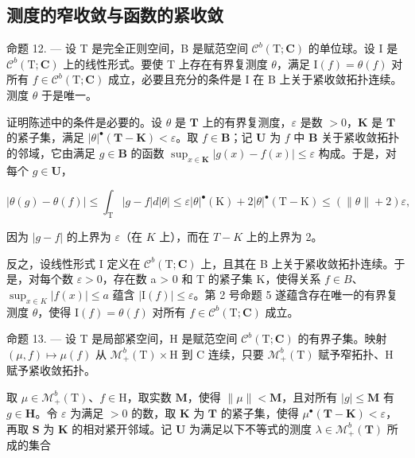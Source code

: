 \subsection{测度的窄收敛与函数的紧收敛}

命题 12. --- 设 T 是完全正则空间，B 是赋范空间 \(\mathcal{C}^{b}(\mathrm{T};\mathbf{C})\) 的单位球。设 I 是 \(\mathcal{C}^{b}(\mathrm{T};\mathbf{C})\) 上的线性形式。要使 T 上存在有界复测度 \(\theta\)，满足 \(\mathrm{I}(f)=\theta(f)\) 对所有 \(f\in\mathcal{C}^{b}(\mathrm{T};\mathbf{C})\) 成立，必要且充分的条件是 I 在 B 上关于紧收敛拓扑连续。测度 \(\theta\) 于是唯一。

证明陈述中的条件是必要的。设 \(\theta\) 是 \(\mathbf{T}\) 上的有界复测度，\(\varepsilon\) 是数 \(>0\)，\(\mathbf{K}\) 是 \(\mathbf{T}\) 的紧子集，满足 \(|\theta|^{\bullet}(\mathbf{T} - \mathbf{K}) < \varepsilon\)。取 \(f \in \mathbf{B}\)；记 \(\mathbf{U}\) 为 \(f\) 中 \(\mathbf{B}\) 关于紧收敛拓扑的邻域，它由满足 \(g \in \mathbf{B}\) 的函数 \(\sup_{x \in \mathbf{K}} |g(x) - f(x)| \leqslant \varepsilon\) 构成。于是，对每个 \(g \in \mathbf{U}\)，

\[
| \theta (g) - \theta (f) | \leqslant \int_ {\mathrm{T}} | g - f | d | \theta | \leqslant \varepsilon | \theta | ^ {\bullet} (\mathrm{K}) + 2 | \theta | ^ {\bullet} (\mathrm{T} - \mathrm{K}) \leqslant (\| \theta \| + 2) \varepsilon ,
\]

因为 \(|g - f|\) 的上界为 \(\varepsilon\)（在 \(K\) 上），而在 \(T - K\) 上的上界为 2。

反之，设线性形式 I 定义在 \(\mathcal{C}^{b}(\mathrm{T};\mathbf{C})\) 上，且其在 B 上关于紧收敛拓扑连续。于是，对每个数 \(\varepsilon > 0\)，存在数 a \textgreater{} 0 和 T 的紧子集 K，使得关系 \(f \in B\)、\(\sup_{x \in K} |f(x)| \leqslant a\) 蕴含 \(|\mathrm{I}(f)| \leqslant \varepsilon\)。第 2 号命题 5 遂蕴含存在唯一的有界复测度 \(\theta\)，使得 \(\mathrm{I}(f) = \theta(f)\) 对所有 \(f \in \mathcal{C}^{b}(\mathrm{T};\mathbf{C})\) 成立。

命题 13. --- 设 T 是局部紧空间，H 是赋范空间 \(\mathcal{C}^{b}(\mathrm{T};\mathbf{C})\) 的有界子集。映射 \((\mu,f)\mapsto\mu(f)\) 从 \(\mathcal{M}_{+}^{b}(\mathrm{T})\times\mathrm{H}\) 到 C 连续，只要 \(\mathcal{M}_{+}^{b}(\mathrm{T})\) 赋予窄拓扑、H 赋予紧收敛拓扑。

取 \(\mu \in \mathcal{M}_{+}^{b}(\mathrm{T})\)、\(f \in \mathrm{H}\)，取实数 \(\mathbf{M}\)，使得 \(\| \mu \| < \mathbf{M}\)，且对所有 \(|g| \leqslant \mathbf{M}\) 有 \(g \in \mathbf{H}\)。令 \(\varepsilon\) 为满足 \(>0\) 的数，取 \(\mathbf{K}\) 为 \(\mathbf{T}\) 的紧子集，使得 \(\mu^{\bullet}(\mathbf{T} - \mathbf{K}) < \varepsilon\)，再取 \(\mathbf{S}\) 为 \(\mathbf{K}\) 的相对紧开邻域。记 \(\mathbf{U}\) 为满足以下不等式的测度 \(\lambda \in \mathcal{M}_{+}^{b}(\mathbf{T})\) 所成的集合

